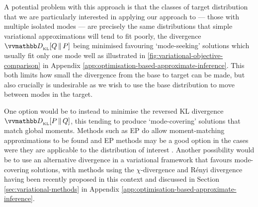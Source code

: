 
A potential problem with this approach is that the classes of target distribution that we are particularly interested in applying our approach to --- those with multiple isolated modes --- are precisely the same distributions that simple variational approximations will tend to fit poorly, the divergence $\kldiv{Q}{\tgtprob}$ being minimised favouring `mode-seeking' solutions which usually fit only one mode well as illustrated in \ref{fig:variational-objective-comparison} in Appendix \ref{app:optimisation-based-approximate-inference}. This both limits how small the divergence from the base to target can be made, but also crucially is undesirable as we wish to use the base distribution to move between modes in the target.

One option would be to instead to minimise the reversed \ac{KL} divergence $\kldiv{\tgtprob}{Q}$, this tending to produce `mode-covering' solutions that match global moments. Methods such as \acf{EP} \citep{minka2001expectation} do allow moment-matching approximations to be found and \ac{EP} methods may be a good option in the cases were they are applicable to the distribution of interest . Another possibility would be to use an alternative divergence in a variational framework that favours mode-covering solutions, with methods using the $\chi$-divergence \citep{dieng2016chi} and R\'enyi divergence \citep{li2016renyi} having been recently proposed in this context and discussed in Section \ref{sec:variational-methods} in Appendix \ref{app:optimisation-based-approximate-inference}.

